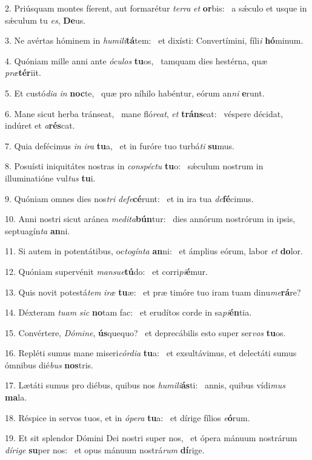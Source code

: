 2. Priúsquam montes fíerent, aut formarétur \textit{ter}\textit{ra} \textit{et} \textbf{or}bis: \ast\  a sǽculo et usque in sǽculum tu \textit{es}, \textbf{De}us.\

3. Ne avértas hóminem in \textit{hu}\textit{mi}\textit{li}\textbf{tá}tem: \ast\  et dixísti: Convertímini, fíli\textit{i} \textbf{hó}minum.\

4. Quóniam mille anni ante \textit{ó}\textit{cu}\textit{los} \textbf{tu}os, \ast\  tamquam dies hestérna, quæ \textit{præ}\textbf{tér}iit.\

5. Et custó\textit{di}\textit{a} \textit{in} \textbf{noc}te, \ast\  quæ pro níhilo habéntur, eórum an\textit{ni} \textbf{e}runt.\

6. Mane sicut herba tránseat, \dag\  mane fló\textit{re}\textit{at}, \textit{et} \textbf{tráns}eat: \ast\  véspere décidat, indúret et \textit{a}\textbf{rés}cat.\

7. Quia defécimus \textit{in} \textit{i}\textit{ra} \textbf{tu}a, \ast\  et in furóre tuo turbá\textit{ti} \textbf{su}mus.\

8. Posuísti iniquitátes nostras in \textit{con}\textit{spéc}\textit{tu} \textbf{tu}o: \ast\  sǽculum nostrum in illuminatióne vul\textit{tus} \textbf{tu}i.\

9. Quóniam omnes dies nos\textit{tri} \textit{de}\textit{fe}\textbf{cé}runt: \ast\  et in ira tua \textit{de}\textbf{fé}cimus.\

10. Anni nostri sicut aránea \textit{me}\textit{di}\textit{ta}\textbf{bún}tur: \ast\  dies annórum nostrórum in ipsis, septuagín\textit{ta} \textbf{an}ni.\

11. Si autem in potentátibus, oc\textit{to}\textit{gín}\textit{ta} \textbf{an}ni: \ast\  et ámplius eórum, labor \textit{et} \textbf{do}lor.\

12. Quóniam supervénit \textit{man}\textit{su}\textit{e}\textbf{tú}do: \ast\  et corri\textit{pi}\textbf{é}mur.\

13. Quis novit potestá\textit{tem} \textit{i}\textit{ræ} \textbf{tu}æ: \ast\  et præ timóre tuo iram tuam dinu\textit{me}\textbf{rá}re?\

14. Déxteram \textit{tu}\textit{am} \textit{sic} \textbf{no}tam fac: \ast\  et erudítos corde in sa\textit{pi}\textbf{én}tia.\

15. Convértere, \textit{Dó}\textit{mi}\textit{ne}, \textbf{ús}quequo? \ast\  et deprecábilis esto super ser\textit{vos} \textbf{tu}os.\

16. Repléti sumus mane miseri\textit{cór}\textit{di}\textit{a} \textbf{tu}a: \ast\  et exsultávimus, et delectáti sumus ómnibus dié\textit{bus} \textbf{nos}tris.\

17. Lætáti sumus pro diébus, quibus nos \textit{hu}\textit{mi}\textit{li}\textbf{ás}ti: \ast\  annis, quibus vídi\textit{mus} \textbf{ma}la.\

18. Réspice in servos tuos, et in \textit{ó}\textit{pe}\textit{ra} \textbf{tu}a: \ast\  et dírige fílios \textit{e}\textbf{ó}rum.\

19. Et sit splendor Dómini Dei nostri super nos, \dag\  et ópera mánuum nostrárum \textit{dí}\textit{ri}\textit{ge} \textbf{su}per nos: \ast\  et opus mánuum nostrá\textit{rum} \textbf{dí}rige.\

